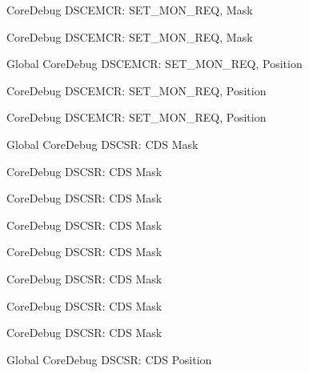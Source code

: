 \begin{DoxyRefList}
\label{deprecated__deprecated000629}%
%
Core\+Debug DSCEMCR\+: SET\+\_\+\+MON\+\_\+\+REQ, Mask 

\label{deprecated__deprecated000527}%
%
Core\+Debug DSCEMCR\+: SET\+\_\+\+MON\+\_\+\+REQ, Mask  
\item[Global \doxylink{group___c_m_s_i_s___s_c_b_ga77f02a6d773fa2c6daafbbdd7df2d9d2}{Core\+Debug\+\_\+\+DSCEMCR\+\_\+\+SET\+\_\+\+MON\+\_\+\+REQ\+\_\+\+Pos} ]\label{deprecated__deprecated000075}%
%
Core\+Debug DSCEMCR\+: SET\+\_\+\+MON\+\_\+\+REQ, Position 

\label{deprecated__deprecated000526}%
%
Core\+Debug DSCEMCR\+: SET\+\_\+\+MON\+\_\+\+REQ, Position 

\label{deprecated__deprecated000628}%
%
Core\+Debug DSCEMCR\+: SET\+\_\+\+MON\+\_\+\+REQ, Position  
\item[Global \doxylink{group___c_m_s_i_s___s_c_b_ga083417245e1aa40e84a2b12433a15a6b}{Core\+Debug\+\_\+\+DSCSR\+\_\+\+CDS\+\_\+\+Msk} ]\label{deprecated__deprecated000094}%
%
Core\+Debug DSCSR\+: CDS Mask 

\label{deprecated__deprecated000148}%
%
Core\+Debug DSCSR\+: CDS Mask 

\label{deprecated__deprecated000224}%
%
Core\+Debug DSCSR\+: CDS Mask 

\label{deprecated__deprecated000442}%
%
Core\+Debug DSCSR\+: CDS Mask 

\label{deprecated__deprecated000366}%
%
Core\+Debug DSCSR\+: CDS Mask 

\label{deprecated__deprecated000545}%
%
Core\+Debug DSCSR\+: CDS Mask 

\label{deprecated__deprecated000647}%
%
Core\+Debug DSCSR\+: CDS Mask 

\label{deprecated__deprecated000287}%
%
Core\+Debug DSCSR\+: CDS Mask  
\item[Global \doxylink{group___c_m_s_i_s___s_c_b_ga4be5d0f8af5d7d8ec04bde78ce18e10e}{Core\+Debug\+\_\+\+DSCSR\+\_\+\+CDS\+\_\+\+Pos} ]\label{deprecated__deprecated000093}%
%
Core\+Debug DSCSR\+: CDS Position 


\end{DoxyRefList}
